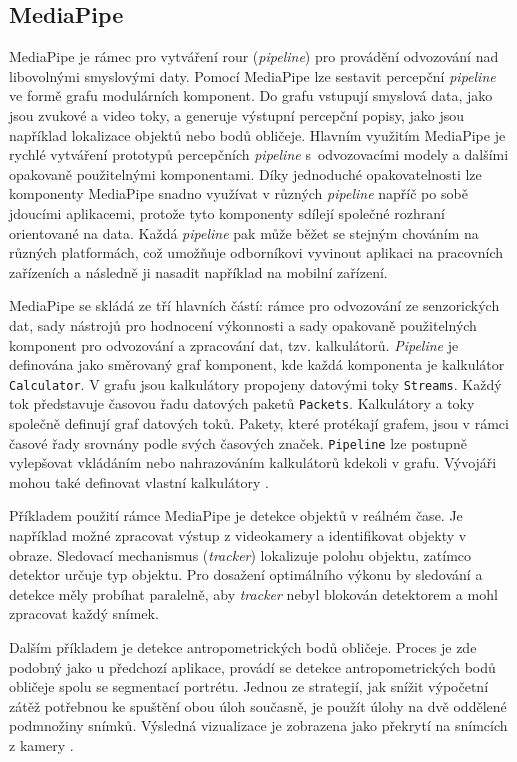 \subsection*{MediaPipe}

MediaPipe \cite{lugaresi2019mediapipe} je rámec pro vytváření rour (\textit{pipeline}) pro provádění odvozování nad libovolnými smyslovými daty. Pomocí MediaPipe lze sestavit percepční \textit{pipeline} ve formě grafu modulárních komponent. Do grafu vstupují smyslová data, jako jsou zvukové a video toky, a generuje výstupní percepční popisy, jako jsou například lokalizace objektů nebo bodů obličeje. Hlavním využitím MediaPipe je rychlé vytváření prototypů percepčních \textit{pipeline} s~odvozovacími modely a dalšími opakovaně použitelnými komponentami. Díky jednoduché opakovatelnosti lze komponenty MediaPipe snadno využívat v různých \textit{pipeline} napříč po sobě jdoucími aplikacemi, protože tyto komponenty sdílejí společné rozhraní orientované na data. Každá \textit{pipeline} pak může běžet se stejným chováním na různých platformách, což umožňuje odborníkovi vyvinout aplikaci na pracovních zařízeních a následně ji nasadit například na mobilní zařízení.

MediaPipe se skládá ze tří hlavních částí: rámce pro odvozování ze senzorických dat, sady nástrojů pro hodnocení výkonnosti a sady opakovaně použitelných komponent pro odvozování a zpracování dat, tzv. kalkulátorů. \textit{Pipeline} je definována jako směrovaný graf komponent, kde každá komponenta je kalkulátor \texttt{Calculator}. V grafu jsou kalkulátory propojeny datovými toky \texttt{Streams}. Každý tok představuje časovou řadu datových paketů \texttt{Packets}. Kalkulátory a toky společně definují graf datových toků. Pakety, které protékají grafem, jsou v rámci časové řady srovnány podle svých časových značek. \texttt{Pipeline} lze postupně vylepšovat vkládáním nebo nahrazováním kalkulátorů kdekoli v grafu. Vývojáři mohou také definovat vlastní kalkulátory \cite{lugaresi2019mediapipe}.

\bigskip

\noindent Příkladem použití rámce MediaPipe je detekce objektů v reálném čase. Je například možné zpracovat výstup z videokamery a identifikovat objekty v obraze. Sledovací mechanismus (\textit{tracker}) lokalizuje polohu objektu, zatímco detektor určuje typ objektu. Pro dosažení optimálního výkonu by sledování a detekce měly probíhat paralelně, aby \textit{tracker} nebyl blokován detektorem a mohl zpracovat každý snímek.

Dalším příkladem je detekce antropometrických bodů obličeje. Proces je zde podobný jako u předchozí aplikace, provádí se detekce antropometrických bodů obličeje spolu se segmentací portrétu. Jednou ze strategií, jak snížit výpočetní zátěž potřebnou ke spuštění obou úloh současně, je použít úlohy na dvě oddělené podmnožiny snímků. Výsledná vizualizace je zobrazena jako překrytí na snímcích z kamery \cite{lugaresi2019mediapipe}.

